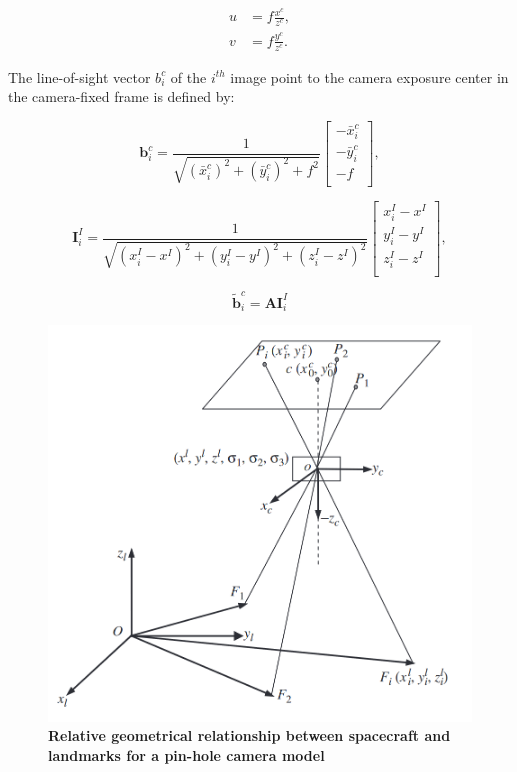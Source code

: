 \begin{equation}
    \begin{aligned}
        u&=f\frac{x^c}{z^c},\\
        v&=f\frac{y^c}{z^c}.
    \end{aligned}
\end{equation}

The line-of-sight vector $b_i^c$ of the $i^{th}$ image point to the camera
exposure center in the camera-fixed frame is defined by:

\begin{equation}
    \mathbf{b}_i^c=\frac{1}{\sqrt{(\bar{x}_i^c)^2+(\bar{y}_i^c)^2+f^2}}
    \begin{bmatrix}
    -\bar{x}^c_i \\
    -\bar{y}^c_i \\
    -f \\
    \end{bmatrix},
\end{equation}

\begin{equation}
    \mathbf{I}_i^I=\frac{1}{\sqrt{(x^I_i - x^I)^2+(y^I_i - y^I)^2+(z^I_i - z^I)^2}}
    \begin{bmatrix}
    x^I_i - x^I \\
    y^I_i - y^I \\
    z^I_i - z^I \\
    \end{bmatrix},
\end{equation}

\begin{equation}
    \tilde{\mathbf{b}}_i^c=\mathbf{A}\mathbf{I}_i^I
\end{equation}


\begin{figure}[htp]
    \centering
    \includegraphics[width=0.55\linewidth]{graphics/landmark_geometry.PNG}
    \caption{
        \textbf{Relative geometrical relationship between spacecraft and landmarks
        for a pin-hole camera model}
    }
\end{figure}





